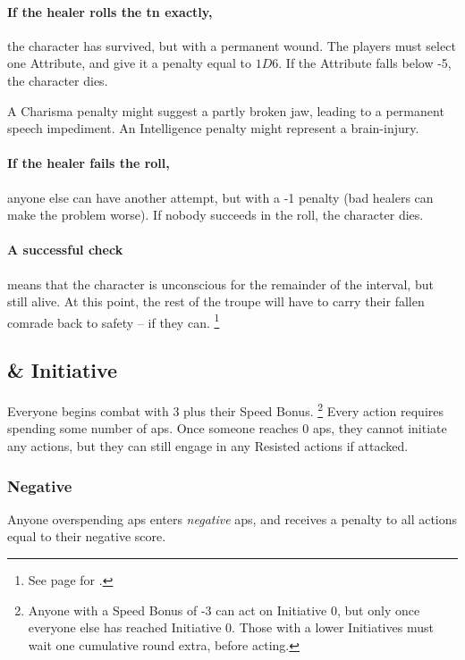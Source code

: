 \begin{multicols}{2}
\paragraph{If the healer rolls the \gls{tn} exactly,}
the character has survived, but with a permanent wound.
The players must select one Attribute, and give it a penalty equal to $1D6$.
If the Attribute falls below -5, the character dies.

A Charisma penalty might suggest a partly broken jaw, leading to a permanent speech impediment.
An Intelligence penalty might represent a brain-injury.

\paragraph{If the healer fails the roll,}
anyone else can have another attempt, but with a -1 penalty (bad healers can make the problem worse).
If nobody succeeds in the roll, the character dies.

\paragraph{A successful check}
means that the character is unconscious for the remainder of the \gls{interval}, but still alive.
At this point, the rest of the troupe will have to carry their fallen comrade back to safety -- if they can.%
\footnote{See page \pageref{weight} for .}

\subsection{ \& Initiative}
\label{actionPoints}

Everyone begins combat with 3  plus their Speed Bonus.%
\footnote{Anyone with a Speed Bonus of -3 can act on Initiative 0, but only once everyone else has reached Initiative 0.
Those with a lower Initiatives must wait one cumulative round extra, before acting.}
Every action requires spending some number of \glspl{ap}.
Once someone reaches 0 \glspl{ap}, they cannot initiate any actions, but they can still engage in any Resisted actions if attacked.

\subsubsection{Negative }
Anyone overspending \glspl{ap} enters \emph{negative} \glspl{ap}, and receives a penalty to all actions equal to their negative score.


\end{multicols}
